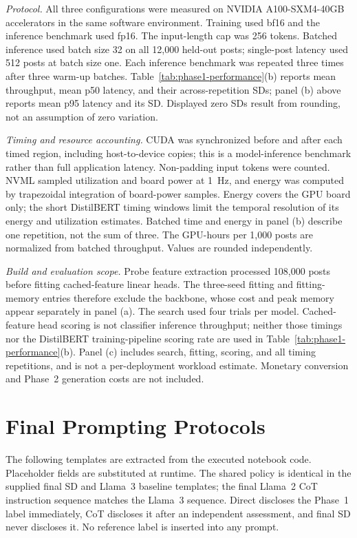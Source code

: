 \documentclass{ieeeaccess}
\begin{document}
\par\smallskip
\noindent\textit{Protocol.} All three configurations were measured on NVIDIA A100-SXM4-40GB accelerators in the same software environment. Training used bf16 and the inference benchmark used fp16. The input-length cap was 256 tokens. Batched inference used batch size 32 on all 12,000 held-out posts; single-post latency used 512 posts at batch size one. Each inference benchmark was repeated three times after three warm-up batches. Table~\ref{tab:phase1-performance}(b) reports mean throughput, mean p50 latency, and their across-repetition SDs; panel (b) above reports mean p95 latency and its SD. Displayed zero SDs result from rounding, not an assumption of zero variation.
\par\smallskip
\noindent\textit{Timing and resource accounting.} CUDA was synchronized before and after each timed region, including host-to-device copies; this is a model-inference benchmark rather than full application latency. Non-padding input tokens were counted. NVML sampled utilization and board power at 1~Hz, and energy was computed by trapezoidal integration of board-power samples. Energy covers the GPU board only; the short DistilBERT timing windows limit the temporal resolution of its energy and utilization estimates. Batched time and energy in panel (b) describe one repetition, not the sum of three. The GPU-hours per 1,000 posts are normalized from batched throughput. Values are rounded independently.
\par\smallskip
\noindent\textit{Build and evaluation scope.} Probe feature extraction processed 108,000 posts before fitting cached-feature linear heads. The three-seed fitting and fitting-memory entries therefore exclude the backbone, whose cost and peak memory appear separately in panel (a). The search used four trials per model. Cached-feature head scoring is not classifier inference throughput; neither those timings nor the DistilBERT training-pipeline scoring rate are used in Table~\ref{tab:phase1-performance}(b). Panel (c) includes search, fitting, scoring, and all timing repetitions, and is not a per-deployment workload estimate. Monetary conversion and Phase~2 generation costs are not included.
\normalsize
\par\medskip

\section{Final Prompting Protocols}
The following templates are extracted from the executed notebook code. Placeholder fields are substituted at runtime. The shared policy is identical in the supplied final SD and Llama~3 baseline templates; the final Llama~2 CoT instruction sequence matches the Llama~3 sequence. Direct discloses the Phase~1 label immediately, CoT discloses it after an independent assessment, and final SD never discloses it. No reference label is inserted into any prompt.
\end{document}
